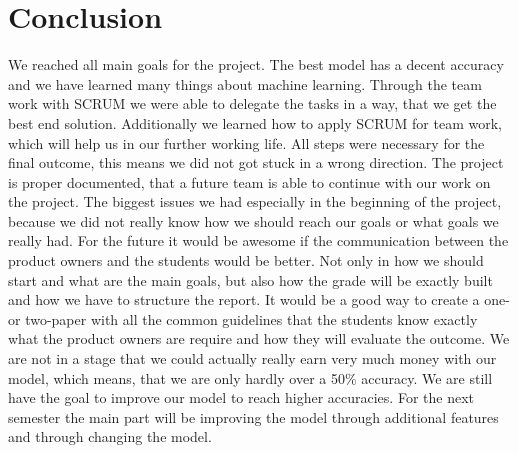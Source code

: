 
\chapter{Conclusion}
\label{chap:conclusion}
We reached all main goals for the project. The best model has a decent accuracy and we have learned many things about machine learning. Through the team work with SCRUM we were able to delegate the tasks in a way, that we get the best end solution. Additionally we learned how to apply SCRUM for team work, which will help us in our further working life. All steps were necessary for the final outcome, this means we did not got stuck in a wrong direction. The project is proper documented, that a future team is able to continue with our work on the project. The biggest issues we had especially in the beginning of the project, because we did not really know how we should reach our goals or what goals we really had. For the future it would be awesome if the communication between the product owners and the students would be better. Not only in how we should start and what are the main goals, but also how the grade will be exactly built and how we have to structure the report. It would be a good way to create a one- or two-paper with all the common guidelines that the students know exactly what the product owners are require and how they will evaluate the outcome. We are not in a stage that we could actually really earn very much money with our model, which means, that we are only hardly over a 50\% accuracy. We are still have the goal to improve our model to reach higher accuracies. For the next semester the main part will be improving the model through additional features and through changing the model.

